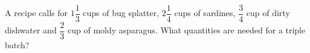 A recipe calls for $1\dfrac13$ cups of bug splatter, $2\dfrac14$ cups of sardines, $\dfrac34$ cup of dirty dishwater and $\dfrac23$ cup of moldy asparagus. What quantities are needed for a triple batch?
